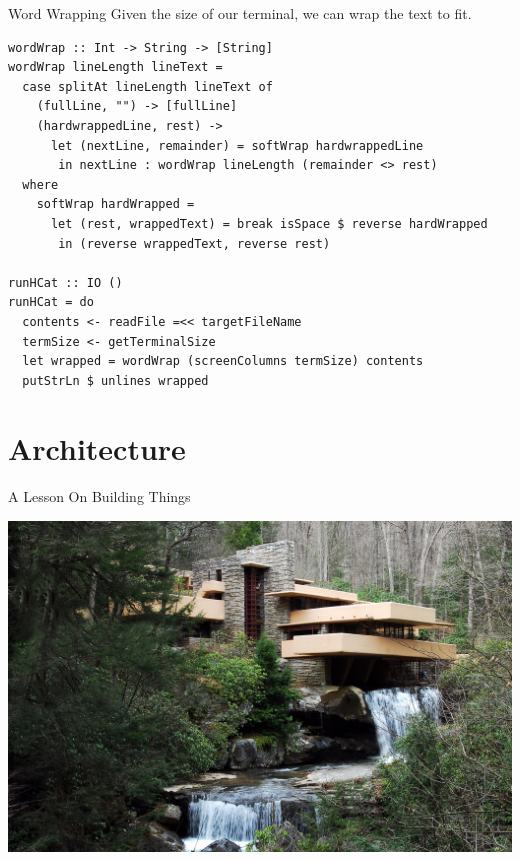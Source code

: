 \documentclass[10pt, presentation, colorlinks]{beamer}
\begin{document}
\begin{frame}[label={sec:org5f9a84f},fragile]{Word Wrapping}
 Given the size of our terminal, we can wrap the text to fit.

\pause
\bigskip

\begin{verbatim}
wordWrap :: Int -> String -> [String]
wordWrap lineLength lineText =
  case splitAt lineLength lineText of
    (fullLine, "") -> [fullLine]
    (hardwrappedLine, rest) ->
      let (nextLine, remainder) = softWrap hardwrappedLine
       in nextLine : wordWrap lineLength (remainder <> rest)
  where
    softWrap hardWrapped =
      let (rest, wrappedText) = break isSpace $ reverse hardWrapped
       in (reverse wrappedText, reverse rest)

runHCat :: IO ()
runHCat = do
  contents <- readFile =<< targetFileName
  termSize <- getTerminalSize
  let wrapped = wordWrap (screenColumns termSize) contents
  putStrLn $ unlines wrapped
\end{verbatim}
\end{frame}

\section{Architecture}
\label{sec:org824e926}

\begin{frame}[label={sec:org3bd40d7}]{A Lesson On Building Things}
\begin{center}
\includegraphics[height=0.6\textheight]{./img/architecture.jpg}
\end{center}
\end{frame}
\end{document}
